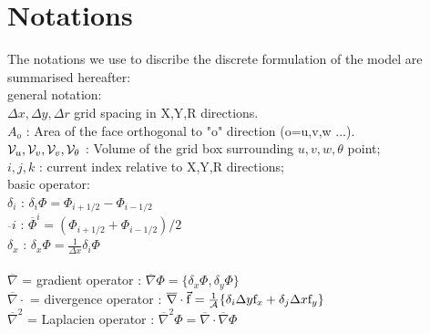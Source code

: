 
\section{Notations} 

The notations we use to discribe the discrete formulation 
of the model are summarised hereafter:\\
general notation:
\\ $\Delta x, \Delta y, \Delta r$ grid spacing in X,Y,R directions.
\\ $A_o$ : Area of the face orthogonal to "o" direction (o=u,v,w ...).
\\ ${\cal V}_u , {\cal V}_v , {\cal V}_v , {\cal V}_\theta$ :
Volume of the grid box surrounding $u,v,w,\theta$ point;
\\ $i,j,k$ : current index relative to X,Y,R directions;
\\basic operator:
\\ $\delta_i $ : $\delta_i \Phi = \Phi_{i+1/2} - \Phi_{i-1/2} $
\\ $\overline{~}i$ : $\overline{\Phi}^i = ( \Phi_{i+1/2} + \Phi_{i-1/2} ) / 2 $ 
\\ $\delta_x $ : $\delta_x \Phi = \frac{1}{\Delta x} \delta_i \Phi $
\\
\\ $\overline{\nabla}$ = gradient operator :  
$\overline{\nabla} \Phi = \{ \delta_x \Phi , \delta_y \Phi \}$
\\ $\overline{\nabla} \cdot$ = divergence operator :  
$\overline{\nabla}\cdot \vec{\mathrm{f}}  = 
\frac{1}{\cal A} \{ \delta_i \Delta y \mathrm{f}_x 
                  + \delta_j \Delta x \mathrm{f}_y \} $
\\ $\overline{\nabla}^2 $ = Laplacien operator :
$ \overline{\nabla}^2 \Phi = 
   \overline{\nabla}\cdot \overline{\nabla}\Phi $

